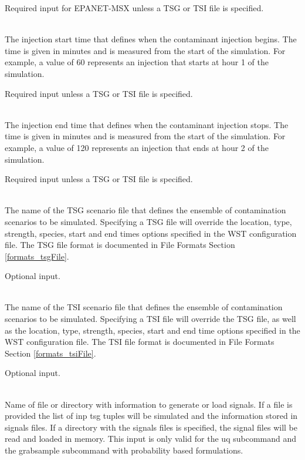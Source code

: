 \begin{description}[topsep=0pt,parsep=0.5em,itemsep=-0.4em]
\begin{description}[topsep=0pt,parsep=0.5em,itemsep=-0.4em]
                Required input for EPANET-MSX unless a TSG or TSI file is specified.
    \item[{start time}]\hfill
\\The injection start time that defines when the contaminant injection begins. 
                The time is given in minutes and is measured from the start of the simulation. 
                For example, a value of 60 represents an injection that starts at hour 1 of the simulation.
                
                Required input unless a TSG or TSI file is specified.
    \item[{end time}]\hfill
\\The injection end time that defines when the contaminant injection stops.				
                The time is given in minutes and is measured from the start of the simulation.
                For example, a value of 120 represents an injection that ends at hour 2 of the simulation.
                
                Required input unless a TSG or TSI file is specified.
    \item[{tsg file}]\hfill
\\The name of the TSG scenario file that defines the ensemble of contamination
                scenarios to be simulated. Specifying a TSG file will
                override the location, type, strength, species, start and end times options specified in
                the WST configuration file. The TSG file format is documented in File Formats Section \ref{formats_tsgFile}.
                
                Optional input.
    \item[{tsi file}]\hfill
\\The name of the TSI scenario file that defines the ensemble of contamination
                scenarios to be simulated. Specifying a TSI file will
                override the TSG file, as well as the location, type, strength, species, start and end time options specified in
                the WST configuration file. The TSI file format is documented in File Formats Section \ref{formats_tsiFile}.
                
                Optional input.
    \item[{signals}]\hfill
\\Name of file or directory with information to generate 
                or load signals. If a file is provided the list of inp tsg tuples
                 will be simulated and the information stored in signals files. If
                a directory with the signals files is specified, the signal files will
                be read and loaded in memory. This input is only valid for the uq
                subcommand and the grabsample subcommand with probability based formulations.


\end{description}
\end{description}
